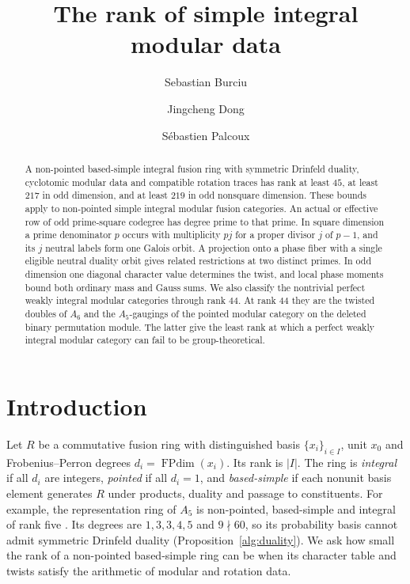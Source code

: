 \documentclass[11pt]{amsart}
\title[The rank of simple integral modular data]{The rank of simple integral modular data}
\author{Sebastian Burciu}
\author{Jingcheng Dong}
\author{S\'ebastien Palcoux}
\date{}
\numberwithin{equation}{section}
\theoremstyle{definition}
\theoremstyle{plain}
\DeclareMathOperator{\FPdim}{FPdim}
\begin{document}
 \relax

\begin{abstract}
A non-pointed based-simple integral fusion ring with symmetric Drinfeld
duality, cyclotomic modular data and compatible rotation traces has
rank at least $45$, at least $217$ in odd dimension, and at least $219$
in odd nonsquare dimension. These bounds
apply to non-pointed simple integral modular fusion categories.
An actual or effective row of odd prime-square codegree has degree
prime to that prime. In square dimension a prime denominator $p$ occurs
with multiplicity $pj$ for a proper divisor $j$ of $p-1$, and its $j$
neutral labels form one Galois orbit. A projection onto a phase fiber
with a single eligible neutral duality orbit gives related restrictions
at two distinct primes. In odd dimension one diagonal character value
determines the twist, and local phase moments bound both ordinary mass
and Gauss sums. We also classify the nontrivial perfect weakly integral modular categories
through rank $44$. At rank $44$ they are the twisted doubles of $A_6$
and the $A_5$-gaugings of the pointed modular category on the deleted
binary permutation module.
The latter give the least rank at which a perfect weakly integral modular
category can fail to be group-theoretical.
\end{abstract}

\maketitle

\section*{Introduction}
Let $R$ be a commutative fusion ring with distinguished basis
$\{x_i\}_{i\in I}$, unit $x_0$ and Frobenius--Perron degrees
$d_i=\FPdim(x_i)$. Its rank is $|I|$. The ring is \emph{integral} if
all $d_i$ are integers, \emph{pointed} if all $d_i=1$, and
\emph{based-simple} if each nonunit basis element generates $R$ under
products, duality and passage to constituents. For example, the
representation ring of $A_5$ is non-pointed, based-simple and integral
of rank five \cite[\S5]{LPR}. Its degrees are $1,3,3,4,5$ and
$9\nmid60$, so its probability basis cannot admit symmetric Drinfeld
duality (Proposition~\ref{alg:duality}). We ask how small the rank of a non-pointed based-simple ring can be when its character
table and twists satisfy the arithmetic of modular and rotation data.
\end{document}
